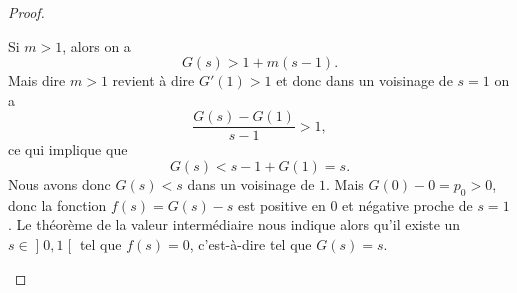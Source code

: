 \begin{proof}
\begin{subproof}
		Si \( m>1\), alors on a
		\begin{equation}
			G(s)>1+m(s-1).
		\end{equation}
		Mais dire \( m>1\) revient à dire \( G'(1)>1\) et donc dans un voisinage de \( s=1\) on a
		\begin{equation}
			\frac{ G(s)-G(1) }{ s-1 }>1,
		\end{equation}
		ce qui implique que
		\begin{equation}
			G(s)<s-1+G(1)=s.
		\end{equation}
		Nous avons donc \( G(s)<s\) dans un voisinage de \( 1\). Mais \( G(0)-0=p_0>0\), donc la fonction \( f(s)=G(s)-s\) est positive en \( 0\) et négative proche de \( s=1\). Le théorème de la valeur intermédiaire nous indique alors qu'il existe un \( s\in \mathopen] 0 , 1 \mathclose[\) tel que \( f(s)=0\), c'est-à-dire tel que \( G(s)=s\).
	\end{subproof}
\end{proof}

